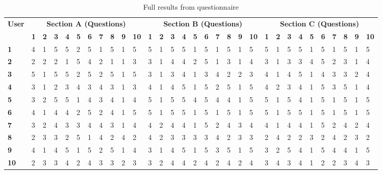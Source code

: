 \documentclass[12pt]{article}
\begin{document}
\begin{table}[!ht]
\centering
\hspace*{-2.5cm}\begin{tabular}{ |l|l|l|l|l|l|l|l|l|l|l|l|l|l|l|l|l|l|l|l|l|l|l|l|l|l|l|l|l|l|l| }
 	\hline
	\multirow{2}{*}{\textbf{User}} & \multicolumn{10}{|c|}{\textbf{Section A (Questions)}} & \multicolumn{10}{|c|}{\textbf{Section B (Questions)}} & \multicolumn{10}{|c|}{\textbf{Section C (Questions)}} \\
	 & \textbf{1} & \textbf{2} & \textbf{3} & \textbf{4} & \textbf{5} & \textbf{6} & \textbf{7} & \textbf{8} & \textbf{9} & \textbf{10} & \textbf{1} & \textbf{2} & \textbf{3} & \textbf{4} & \textbf{5} & \textbf{6} & \textbf{7} & \textbf{8} & \textbf{9} & \textbf{10} & \textbf{1} & \textbf{2} & \textbf{3} & \textbf{4} & \textbf{5} & \textbf{6} & \textbf{7} & \textbf{8} & \textbf{9} & \textbf{10} \\
	\hline
	\textbf{1} & 4 & 1 & 5 & 5 & 2 & 5 & 1 & 5 & 1 & 5 & 5 & 1 & 5 & 5 & 1 & 5 & 1 & 5 & 1 & 5 & 5 & 1 & 5 & 5 & 1 & 5 & 1 & 5 & 1 & 5 \\
	\hline
	\textbf{2} & 2 & 2 & 2 & 1 & 5 & 4 & 2 & 1 & 1 & 3 & 3 & 1 & 4 & 4 & 2 & 5 & 1 & 3 & 1 & 4 & 3 & 1 & 3 & 3 & 4 & 5 & 2 & 3 & 1 & 4 \\
	\hline
	\textbf{3} & 5 & 1 & 5 & 5 & 2 & 5 & 2 & 5 & 1 & 5 & 3 & 1 & 3 & 4 & 1 & 3 & 4 & 2 & 2 & 3 & 4 & 1 & 4 & 5 & 1 & 4 & 3 & 3 & 2 & 4 \\
	\hline
	\textbf{4} & 3 & 1 & 2 & 3 & 4 & 3 & 4 & 3 & 1 & 3 & 4 & 1 & 4 & 5 & 1 & 5 & 2 & 5 & 1 & 5 & 4 & 2 & 3 & 4 & 1 & 5 & 3 & 5 & 1 & 4 \\
	\hline
	\textbf{5} & 3 & 2 & 5 & 5 & 1 & 4 & 3 & 4 & 1 & 4 & 5 & 1 & 5 & 5 & 4 & 5 & 4 & 4 & 1 & 5 & 5 & 1 & 5 & 4 & 1 & 5 & 1 & 5 & 1 & 5 \\
	\hline
	\textbf{6} & 4 & 1 & 4 & 4 & 2 & 5 & 2 & 4 & 1 & 5 & 5 & 1 & 5 & 5 & 1 & 5 & 1 & 5 & 1 & 5 & 5 & 1 & 5 & 5 & 1 & 5 & 1 & 5 & 1 & 5 \\
	\hline
	\textbf{7} & 3 & 2 & 4 & 3 & 3 & 4 & 4 & 3 & 1 & 4 & 4 & 2 & 4 & 4 & 1 & 5 & 2 & 4 & 3 & 4 & 4 & 1 & 4 & 4 & 1 & 5 & 2 & 4 & 2 & 4 \\
	\hline
	\textbf{8} & 2 & 3 & 3 & 2 & 5 & 1 & 4 & 2 & 4 & 2 & 4 & 2 & 3 & 3 & 3 & 3 & 4 & 2 & 3 & 3 & 2 & 4 & 2 & 2 & 3 & 2 & 4 & 2 & 3 & 2 \\
	\hline
	\textbf{9} & 4 & 1 & 4 & 5 & 1 & 5 & 2 & 5 & 1 & 4 & 3 & 1 & 4 & 5 & 1 & 5 & 3 & 5 & 1 & 5 & 3 & 2 & 5 & 4 & 1 & 5 & 4 & 4 & 1 & 5 \\
	\hline
	\textbf{10} & 2 & 3 & 3 & 4 & 2 & 4 & 3 & 3 & 2 & 3 & 3 & 2 & 4 & 4 & 2 & 4 & 2 & 4 & 2 & 4 & 3 & 4 & 3 & 4 & 1 & 2 & 2 & 3 & 4 & 3 \\
	\hline
\end{tabular}
\caption{Full results from questionnaire}
\end{table}
\end{document}
